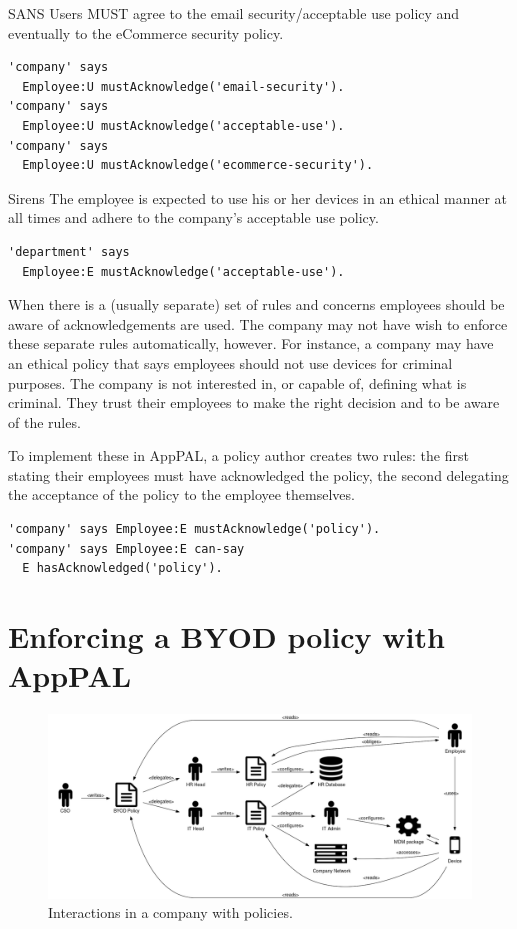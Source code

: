 \documentclass[thesis.tex]{subfiles}
\begin{document}
\begin{policyrule}{SANS}
  Users MUST agree to the email security/acceptable use policy and eventually to the eCommerce security policy.
  \begin{lstlisting}
'company' says
  Employee:U mustAcknowledge('email-security').
'company' says
  Employee:U mustAcknowledge('acceptable-use').
'company' says
  Employee:U mustAcknowledge('ecommerce-security').
  \end{lstlisting}
\end{policyrule}
\begin{policyrule}{Sirens}
  The employee is expected to use his or her devices in an ethical manner at all times and adhere to the company's acceptable use policy.
  \begin{lstlisting}
'department' says
  Employee:E mustAcknowledge('acceptable-use').
  \end{lstlisting}
\end{policyrule}

When there is a (usually separate) set of rules and concerns employees should be aware of acknowledgements are used.
The company may not have wish to enforce these separate rules automatically, however.
For instance, a company may have an ethical policy that says employees should not use devices for criminal purposes.
The company is not interested in, or capable of, defining what is criminal.
They trust their employees to make the right decision and to be aware of the rules.

To implement these in AppPAL, a policy author creates two rules:
  the first stating their employees must have acknowledged the policy,
  the second delegating the acceptance of the policy to the employee themselves.
\begin{lstlisting}
'company' says Employee:E mustAcknowledge('policy').
'company' says Employee:E can-say
  E hasAcknowledged('policy').
\end{lstlisting}


\section{Enforcing a BYOD policy with AppPAL}

\begin{figure}
  \centering
  \includegraphics[width=\textwidth]{figures/mdm-overview.pdf}
  \caption{Interactions in a company with policies.}
  \label{fig:mdm-overview}
\end{figure}
\end{document}
